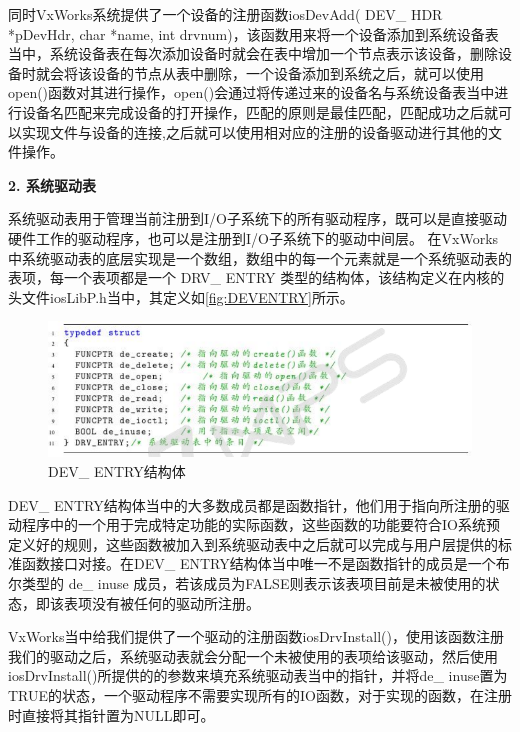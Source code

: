 同时VxWorks系统提供了一个设备的注册函数iosDevAdd( DEV\_ HDR *pDevHdr, char *name, int drvnum)，该函数用来将一个设备添加到系统设备表当中，系统设备表在每次添加设备时就会在表中增加一个节点表示该设备，删除设备时就会将该设备的节点从表中删除，一个设备添加到系统之后，就可以使用open()函数对其进行操作，open()会通过将传递过来的设备名与系统设备表当中进行设备名匹配来完成设备的打开操作，匹配的原则是最佳匹配，匹配成功之后就可以实现文件与设备的连接\cite{刘小军2008基于},之后就可以使用相对应的注册的设备驱动进行其他的文件操作。

\noindent \textbf{2. 系统驱动表}


	系统驱动表用于管理当前注册到I/O子系统下的所有驱动程序，既可以是直接驱动硬件工作的驱动程序，也可以是注册到I/O子系统下的驱动中间层\cite{VxWorks内核解读}。
	在VxWorks中系统驱动表的底层实现是一个数组，数组中的每一个元素就是一个系统驱动表的表项，每一个表项都是一个 DRV\_ ENTRY 类型的结构体，该结构定义在内核的头文件iosLibP.h当中，其定义如\autoref{fig:DEVENTRY}所示。
	
\begin{figure}[!h]
\centering
\includegraphics[width=1.0\textwidth]{./graphics/DEVENTRY.pdf}
\caption{DEV\_ ENTRY结构体}\label{fig:DEVENTRY}
\end{figure}

	DEV\_ ENTRY结构体当中的大多数成员都是函数指针，他们用于指向所注册的驱动程序中的一个用于完成特定功能的实际函数，这些函数的功能要符合IO系统预定义好的规则，这些函数被加入到系统驱动表中之后就可以完成与用户层提供的标准函数接口对接\cite{VxWorks内核解读}\cite{VxWorksDriverAPI}\cite{Wind2003VxWorks}。在DEV\_ ENTRY结构体当中唯一不是函数指针的成员是一个布尔类型的 de\_ inuse 成员，若该成员为FALSE则表示该表项目前是未被使用的状态，即该表项没有被任何的驱动所注册。

	VxWorks当中给我们提供了一个驱动的注册函数iosDrvInstall()，使用该函数注册我们的驱动之后，系统驱动表就会分配一个未被使用的表项给该驱动，然后使用iosDrvInstall()所提供的的参数来填充系统驱动表当中的指针，并将de\_ inuse置为TRUE的状态，一个驱动程序不需要实现所有的IO函数，对于实现的函数，在注册时直接将其指针置为NULL即可。

